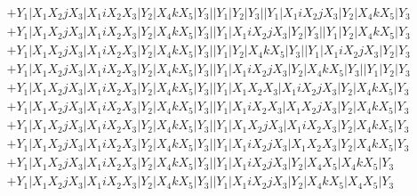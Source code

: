 \documentclass{article}[12pt]
\begin{document}
\begin{align*}
 & +Y_1|X_1X_2jX_3|X_1iX_2X_3|Y_2|X_4kX_5|Y_3||Y_1|Y_2|Y_3||Y_1|X_1iX_2jX_3|Y_2|X_4kX_5|Y_3\\ 
 & +Y_1|X_1X_2jX_3|X_1iX_2X_3|Y_2|X_4kX_5|Y_3||Y_1|X_1iX_2jX_3|Y_2|Y_3||Y_1|Y_2|X_4kX_5|Y_3\\ 
 & +Y_1|X_1X_2jX_3|X_1iX_2X_3|Y_2|X_4kX_5|Y_3||Y_1|Y_2|X_4kX_5|Y_3||Y_1|X_1iX_2jX_3|Y_2|Y_3\\ 
 & +Y_1|X_1X_2jX_3|X_1iX_2X_3|Y_2|X_4kX_5|Y_3||Y_1|X_1iX_2jX_3|Y_2|X_4kX_5|Y_3||Y_1|Y_2|Y_3\\ 
 & +Y_1|X_1X_2jX_3|X_1iX_2X_3|Y_2|X_4kX_5|Y_3||Y_1|X_1X_2X_3|X_1iX_2jX_3|Y_2|X_4kX_5|Y_3\\ 
 & +Y_1|X_1X_2jX_3|X_1iX_2X_3|Y_2|X_4kX_5|Y_3||Y_1|X_1iX_2X_3|X_1X_2jX_3|Y_2|X_4kX_5|Y_3\\ 
 & +Y_1|X_1X_2jX_3|X_1iX_2X_3|Y_2|X_4kX_5|Y_3||Y_1|X_1X_2jX_3|X_1iX_2X_3|Y_2|X_4kX_5|Y_3\\ 
 & +Y_1|X_1X_2jX_3|X_1iX_2X_3|Y_2|X_4kX_5|Y_3||Y_1|X_1iX_2jX_3|X_1X_2X_3|Y_2|X_4kX_5|Y_3\\ 
 & +Y_1|X_1X_2jX_3|X_1iX_2X_3|Y_2|X_4kX_5|Y_3||Y_1|X_1iX_2jX_3|Y_2|X_4X_5|X_4kX_5|Y_3\\ 
 & +Y_1|X_1X_2jX_3|X_1iX_2X_3|Y_2|X_4kX_5|Y_3||Y_1|X_1iX_2jX_3|Y_2|X_4kX_5|X_4X_5|Y_3\end{align*}
\end{document}
